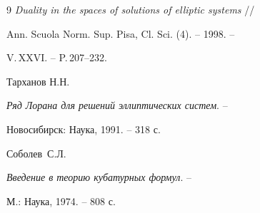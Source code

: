 \begin{thebibliography}{9}
{\em Duality in the spaces of solutions of elliptic systems} //


Ann. Scuola Norm. Sup. Pisa, Cl. Sci. (4). -- 1998. --


V.\,XXVI. -- P.\,207--232.





 {Тарханов Н.Н.}


{\em Ряд Лорана для решений эллиптических систем}. --


Новосибирск: Наука, 1991. -- 318 с.





 {Соболев~С.Л.}


{\em Введение в теорию кубатурных формул}. --


М.: Наука, 1974. -- 808 с.





\end{thebibliography}





\vskip 0.5cm














\label{end}





